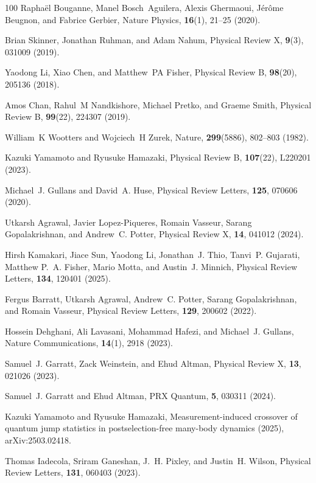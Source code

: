 \documentclass[preprint,pteplogo]{ptephy_v2}%
\numberwithin{equation}{section}
\theoremstyle{definition}
\begin{document}
\begin{thebibliography}{100}
Rapha{\"e}l Bouganne, Manel Bosch~Aguilera, Alexis Ghermaoui, J{\'e}r{\^o}me Beugnon, and Fabrice Gerbier, Nature Physics, {\bf 16}(1), 21--25 (2020).

Brian Skinner, Jonathan Ruhman, and Adam Nahum, Physical Review X, {\bf 9}(3), 031009 (2019).

Yaodong Li, Xiao Chen, and Matthew~PA Fisher, Physical Review B, {\bf 98}(20), 205136 (2018).

Amos Chan, Rahul~M Nandkishore, Michael Pretko, and Graeme Smith, Physical Review B, {\bf 99}(22), 224307 (2019).

William~K Wootters and Wojciech~H Zurek, Nature, {\bf 299}(5886), 802--803 (1982).

Kazuki Yamamoto and Ryusuke Hamazaki, Physical Review B, {\bf 107}(22), L220201 (2023).

Michael~J. Gullans and David~A. Huse, Physical Review Letters, {\bf 125}, 070606 (2020).

Utkarsh Agrawal, Javier Lopez-Piqueres, Romain Vasseur, Sarang Gopalakrishnan, and Andrew~C. Potter, Physical Review X, {\bf 14}, 041012 (2024).

Hirsh Kamakari, Jiace Sun, Yaodong Li, Jonathan~J. Thio, Tanvi~P. Gujarati, Matthew P.~A. Fisher, Mario Motta, and Austin~J. Minnich, Physical Review Letters, {\bf 134}, 120401 (2025).

Fergus Barratt, Utkarsh Agrawal, Andrew~C. Potter, Sarang Gopalakrishnan, and Romain Vasseur, Physical Review Letters, {\bf 129}, 200602 (2022).

Hossein Dehghani, Ali Lavasani, Mohammad Hafezi, and Michael~J. Gullans, Nature Communications, {\bf 14}(1), 2918 (2023).

Samuel~J. Garratt, Zack Weinstein, and Ehud Altman, Physical Review X, {\bf 13}, 021026 (2023).

Samuel~J. Garratt and Ehud Altman, PRX Quantum, {\bf 5}, 030311 (2024).

Kazuki Yamamoto and Ryusuke Hamazaki,
\newblock Measurement-induced crossover of quantum jump statistics in postselection-free many-body dynamics (2025),  {{arXiv:2503.02418}}.

Thomas Iadecola, Sriram Ganeshan, J.~H. Pixley, and Justin~H. Wilson, Physical Review Letters, {\bf 131}, 060403 (2023).


\end{thebibliography}
\end{document}
